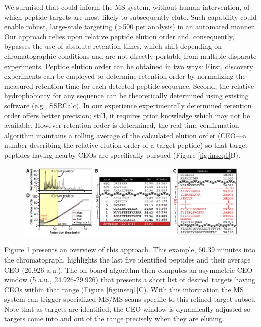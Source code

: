 We surmised that \inseq{} could inform the MS system, without human intervention, of which peptide targets are most likely to subsequently elute. Such capability could enable robust, large-scale targeting (>500 per analysis) in an automated manner. Our approach relies upon relative peptide elution order and, consequently, bypasses the use of absolute retention times, which shift depending on chromatographic conditions and are not directly portable from multiple disparate experiments. Peptide elution order can be obtained in two ways: First, discovery experiments can be employed to determine retention order by normalizing the measured retention time for each detected peptide sequence. Second, the relative hydrophobicity for any sequence can be theoretically determined using existing software (e.g., SSRCalc).\cite{ssrcalc1,ssrcalc2,incselect} In our experience experimentally determined retention order offers better precision; still, it requires prior knowledge which may not be available. However retention order is determined, the real-time confirmation algorithm maintains a rolling average of the calculated elution order (CEO---a number describing the relative elution order of a target peptide) so that target peptides having nearby CEOs are specifically pursued (Figure \ref{fig:inseq1}B).
\begin{figure}
	\centering
	\includegraphics[width=\columnwidth]{inseq/inSeq_Fig 2.png}
	\label{fig:inseq2}
\end{figure}
Figure \ref{fig:inseq2} presents an overview of this approach. This example, 60.39 minutes into the chromatograph, highlights the last five \inseq{} identified peptides and their average CEO (26.926 a.u.). The on-board algorithm then computes an asymmetric CEO window (5 a.u., 24.926-29.926) that presents a short list of desired targets having CEOs within that range (Figure \ref{fig:inseq1}C). With this information the MS system can trigger specialized MS/MS scans specific to this refined target subset. Note that as targets are identified, the CEO window is dynamically adjusted so targets come into and out of the range precisely when they are eluting.

